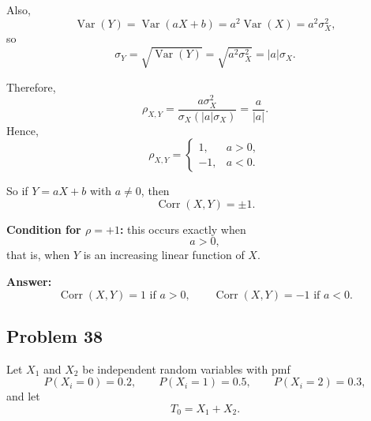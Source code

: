 Also,
\[
\operatorname{Var}(Y)=\operatorname{Var}(aX+b)=a^2\operatorname{Var}(X)=a^2\sigma_X^2,
\]
so
\[
\sigma_Y=\sqrt{\operatorname{Var}(Y)}=\sqrt{a^2\sigma_X^2}=|a|\sigma_X.
\]

Therefore,
\[
\rho_{X,Y}
=\frac{a\sigma_X^2}{\sigma_X(|a|\sigma_X)}
=\frac{a}{|a|}.
\]
Hence,
\[
\rho_{X,Y}=
\begin{cases}
1, & a>0,\\[1ex]
-1, & a<0.
\end{cases}
\]

So if $Y=aX+b$ with $a\ne 0$, then
\[
\operatorname{Corr}(X,Y)=\pm 1.
\]

\textbf{Condition for $\rho=+1$:} this occurs exactly when
\[
a>0,
\]
that is, when $Y$ is an increasing linear function of $X$.

\textbf{Answer:}
\[
\operatorname{Corr}(X,Y)=1 \text{ if } a>0, \qquad \operatorname{Corr}(X,Y)=-1 \text{ if } a<0.
\]

\subsection*{Problem 38}

Let $X_1$ and $X_2$ be independent random variables with pmf
\[
P(X_i=0)=0.2,\qquad P(X_i=1)=0.5,\qquad P(X_i=2)=0.3,
\]
and let
\[
T_0=X_1+X_2.
\]

